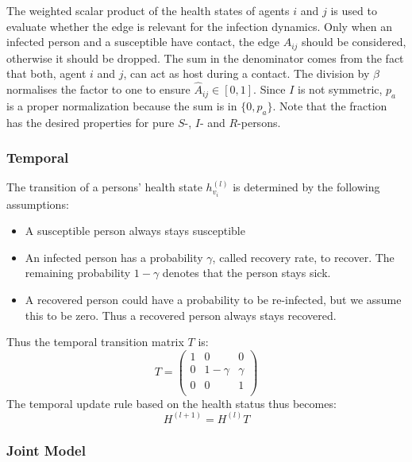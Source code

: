 \documentclass[%
 reprint,
 amsmath,amssymb,showkeys,
 aps,
]{revtex4-1}
\begin{document}
\begin{itemize}
\begin{itemize}
\begin{equation}
		\end{equation}
		The weighted scalar product of the health states of agents $i$ and $j$ is used to evaluate whether the edge is relevant for the infection dynamics. Only when an infected person and a susceptible have contact, the edge $A_{ij}$ should be considered, otherwise it should be dropped.	The sum in the denominator comes from the fact that both, agent $i$ and $j$, can act as host during a contact. The division by $\beta$ normalises the factor to one to ensure $\hat{A}_{ij} \in [0, 1]$. Since $I$ is not symmetric, $p_a$ is a proper normalization because the sum is in $\{0, p_a\}$. Note that the fraction has the desired properties for pure $S$-, $I$- and $R$-persons.
	\end{itemize}
\end{itemize}


\subsubsection{Temporal}
The transition of a persons' health state $h_{v_i}^{(l)}$ is determined by the following assumptions:
\begin{itemize}
	\item A susceptible person always stays susceptible
	\item An infected person has a probability $\gamma$, called recovery rate, to recover. The remaining probability $1-\gamma$ denotes that the person stays sick.
	\item A recovered person could have a probability to be re-infected, but we assume this to be zero. Thus a recovered person always stays recovered.
\end{itemize}
Thus the temporal transition matrix $T$ is:
\begin{equation}
T = 
\begin{pmatrix}
1 &     0    & 0      \\
0 & 1-\gamma & \gamma \\
0 &     0    & 1      \\
\end{pmatrix}
\end{equation}
The temporal update rule based on the health status thus becomes:
\begin{equation}
H^{(l+1)} = H^{(l)} T
\end{equation}

\subsubsection{Joint Model}
\end{document}
